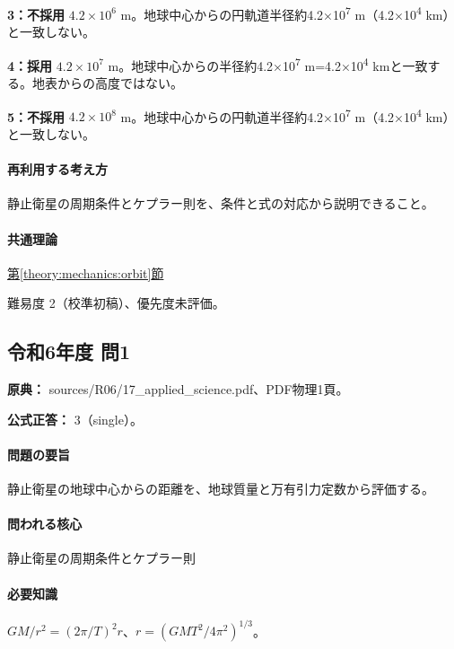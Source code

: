 \noindent\textbf{3：不採用} \(4.2\times10^6\) m。地球中心からの円軌道半径約4.2×10\textsuperscript{7} m（4.2×10\textsuperscript{4} km）と一致しない。\par

\noindent\textbf{4：採用} \(4.2\times10^7\) m。地球中心からの半径約4.2×10\textsuperscript{7} m=4.2×10\textsuperscript{4} kmと一致する。地表からの高度ではない。\par

\noindent\textbf{5：不採用} \(4.2\times10^8\) m。地球中心からの円軌道半径約4.2×10\textsuperscript{7} m（4.2×10\textsuperscript{4} km）と一致しない。\par

\paragraph{再利用する考え方} 静止衛星の周期条件とケプラー則を、条件と式の対応から説明できること。

\paragraph{共通理論} \hyperref[theory:mechanics:orbit]{第\ref*{theory:mechanics:orbit}節}

\par 難易度 2（校準初稿）、優先度未評価。

\subsection{令和6年度 問1}
\label{q:r06-reg-applied-01}

\noindent\textbf{原典：} sources/R06/17\_applied\_science.pdf、PDF物理1頁。

\textbf{公式正答：} 3（single）。

\paragraph{問題の要旨} 静止衛星の地球中心からの距離を、地球質量と万有引力定数から評価する。

\paragraph{問われる核心} 静止衛星の周期条件とケプラー則

\paragraph{必要知識} \(GM/r^2=(2\pi/T)^2r\)、\(r=(GMT^2/4\pi^2)^{1/3}\)。

